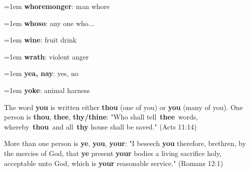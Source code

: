{\begin{multicols}{3}
{\hangindent=1em \textbf{whoremonger}: man whore\par
\hangindent=1em \textbf{whoso}: any one who...\par
\hangindent=1em \textbf{wine}: fruit drink\par
\hangindent=1em \textbf{wrath}: violent anger\par
\hangindent=1em \textbf{yea, nay}: yes, no\par
\hangindent=1em \textbf{yoke}: animal harness\par
}\end{multicols}
\setlength{\parindent}{1em}
\par
The word \textbf{you} is written either \textbf{thou} (one of you) or \textbf{you} (many of you).
One person is \textbf{thou}, \textbf{thee}, \textbf{thy/thine}:
"Who shall tell \textbf{thee} words, whereby \textbf{thou} and all \textbf{thy} house shall be saved."
(Acts 11:14)
\par
More than one person is \textbf{ye}, \textbf{you}, \textbf{your}:
"I beseech \textbf{you} therefore, brethren, by the mercies of God, that \textbf{ye} present
\textbf{your} bodies a living sacrifice holy, acceptable unto God, which is \textbf{your}
reasonable service." (Romans 12:1)
}
